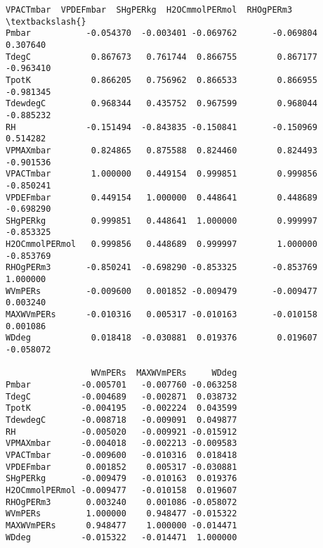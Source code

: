 \documentclass[11pt]{article}
\begin{document}
\begin{Verbatim}[commandchars=\\\{\}]
                VPACTmbar  VPDEFmbar  SHgPERkg  H2OCmmolPERmol  RHOgPERm3  \textbackslash{}
Pmbar           -0.054370  -0.003401 -0.069762       -0.069804   0.307640   
TdegC            0.867673   0.761744  0.866755        0.867177  -0.963410   
TpotK            0.866205   0.756962  0.866533        0.866955  -0.981345   
TdewdegC         0.968344   0.435752  0.967599        0.968044  -0.885232   
RH              -0.151494  -0.843835 -0.150841       -0.150969   0.514282   
VPMAXmbar        0.824865   0.875588  0.824460        0.824493  -0.901536   
VPACTmbar        1.000000   0.449154  0.999851        0.999856  -0.850241   
VPDEFmbar        0.449154   1.000000  0.448641        0.448689  -0.698290   
SHgPERkg         0.999851   0.448641  1.000000        0.999997  -0.853325   
H2OCmmolPERmol   0.999856   0.448689  0.999997        1.000000  -0.853769   
RHOgPERm3       -0.850241  -0.698290 -0.853325       -0.853769   1.000000   
WVmPERs         -0.009600   0.001852 -0.009479       -0.009477   0.003240   
MAXWVmPERs      -0.010316   0.005317 -0.010163       -0.010158   0.001086   
WDdeg            0.018418  -0.030881  0.019376        0.019607  -0.058072   

                 WVmPERs  MAXWVmPERs     WDdeg  
Pmbar          -0.005701   -0.007760 -0.063258  
TdegC          -0.004689   -0.002871  0.038732  
TpotK          -0.004195   -0.002224  0.043599  
TdewdegC       -0.008718   -0.009091  0.049877  
RH             -0.005020   -0.009921 -0.015912  
VPMAXmbar      -0.004018   -0.002213 -0.009583  
VPACTmbar      -0.009600   -0.010316  0.018418  
VPDEFmbar       0.001852    0.005317 -0.030881  
SHgPERkg       -0.009479   -0.010163  0.019376  
H2OCmmolPERmol -0.009477   -0.010158  0.019607  
RHOgPERm3       0.003240    0.001086 -0.058072  
WVmPERs         1.000000    0.948477 -0.015322  
MAXWVmPERs      0.948477    1.000000 -0.014471  
WDdeg          -0.015322   -0.014471  1.000000  


\end{Verbatim}
\end{document}
